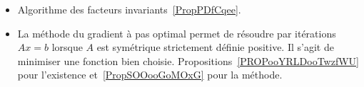 
	\label{THEMEooSystEquations}
\begin{itemize}
	\item Algorithme des facteurs invariants~\ref{PropPDfCqee}.
	\item La méthode du gradient à pas optimal permet de résoudre par itérations \( Ax=b\) lorsque \( A\) est symétrique strictement définie positive. Il s'agit de minimiser une fonction bien choisie. Propositions~\ref{PROPooYRLDooTwzfWU} pour l'existence et~\ref{PropSOOooGoMOxG} pour la méthode.
\end{itemize}
